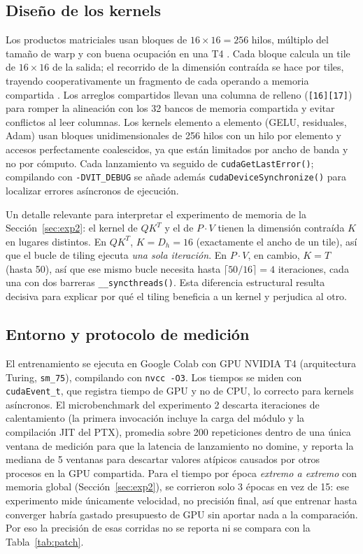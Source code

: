 \documentclass[11pt,a4paper]{article}
\begin{document}
\subsection{Diseño de los kernels}
\label{sec:diseno}

Los productos matriciales usan bloques de $16\times16 = 256$ hilos, múltiplo del
tamaño de warp y con buena ocupación en una T4 \cite{nvidia2024cuda}. Cada bloque
calcula un tile de $16\times16$ de la salida; el recorrido de la dimensión
contraída se hace por tiles, trayendo cooperativamente un fragmento de cada
operando a memoria compartida \cite{kirk2016programming}. Los arreglos
compartidos llevan una columna de relleno (\texttt{[16][17]}) para romper la
alineación con los 32 bancos de memoria compartida y evitar conflictos al leer
columnas. Los kernels elemento a elemento (GELU, residuales, Adam) usan bloques
unidimensionales de 256 hilos con un hilo por elemento y accesos perfectamente
coalescidos, ya que están limitados por ancho de banda y no por cómputo. Cada
lanzamiento va seguido de \texttt{cudaGetLastError()}; compilando con
\texttt{-DVIT\_DEBUG} se añade además \texttt{cudaDeviceSynchronize()} para
localizar errores asíncronos de ejecución.

Un detalle relevante para interpretar el experimento de memoria de la
Sección~\ref{sec:exp2}: el kernel de $QK^{T}$ y el de $P\cdot V$ tienen la
dimensión contraída $K$ en lugares distintos. En $QK^{T}$, $K = D_h = 16$
(exactamente el ancho de un tile), así que el bucle de tiling ejecuta
\emph{una sola iteración}. En $P\cdot V$, en cambio, $K = T$ (hasta 50), así
que ese mismo bucle necesita hasta $\lceil 50/16 \rceil = 4$ iteraciones, cada
una con dos barreras \texttt{\_\_syncthreads()}. Esta diferencia estructural
resulta decisiva para explicar por qué el tiling beneficia a un kernel y
perjudica al otro.

\subsection{Entorno y protocolo de medición}

El entrenamiento se ejecuta en Google Colab con GPU NVIDIA T4 (arquitectura
Turing, \texttt{sm\_75}), compilando con \texttt{nvcc -O3}. Los tiempos se miden
con \texttt{cudaEvent\_t}, que registra tiempo de GPU y no de CPU, lo correcto
para kernels asíncronos. El microbenchmark del experimento 2 descarta
iteraciones de calentamiento (la primera invocación incluye la carga del módulo
y la compilación JIT del PTX), promedia sobre 200 repeticiones dentro de una
única ventana de medición para que la latencia de lanzamiento no domine, y
reporta la mediana de 5 ventanas para descartar valores atípicos causados por
otros procesos en la GPU compartida. Para el tiempo por época \emph{extremo a
extremo} con memoria global (Sección~\ref{sec:exp2}), se corrieron solo 3
épocas en vez de 15: ese experimento mide únicamente velocidad, no precisión
final, así que entrenar hasta converger habría gastado presupuesto de GPU sin
aportar nada a la comparación. Por eso la precisión de esas corridas no se
reporta ni se compara con la Tabla~\ref{tab:patch}.
\end{document}
